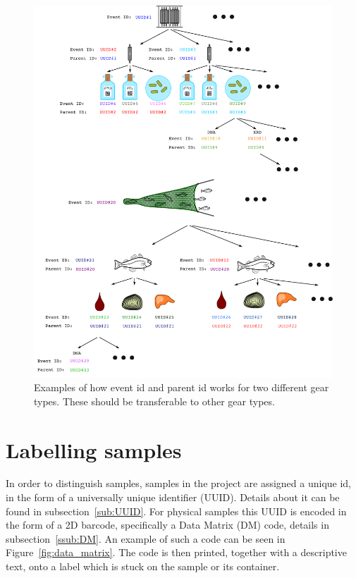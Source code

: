 \documentclass[a4paper,english, 11pt]{article}
\begin{document}
\begin{figure}[htbp]
    \centering
    \includegraphics[width=1\textwidth]{Labeling.pdf}
    \caption{\label{fig:parent_uuid}
       Examples of how event id and parent id works for two different gear types. These should be transferable to other gear types.
    }
\end{figure}
\section{Labelling samples} %
\label{sec:labelling samples}



In order to distinguish samples, samples in the project are assigned a unique id, in the form of a universally unique identifier (UUID). Details about it can be found in subsection~\ref{sub:UUID}. For physical samples this UUID is encoded in the form of a 2D barcode, specifically a Data Matrix (DM) code, details in subsection~\ref{ssub:DM}. An example of such a code can be seen in Figure~\ref{fig:data_matrix}. The code is then printed, together with a descriptive text, onto a label which is stuck on the sample or its container.
\end{document}

